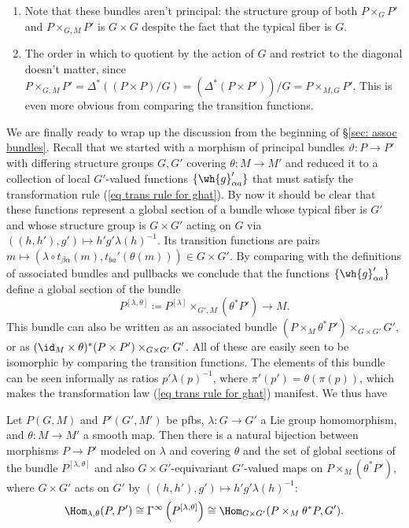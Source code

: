 \begin{rem}
\begin{enumerate}
    \item Note that these bundles aren't principal: the structure group of both $P\times_G P'$ and $P\times_{G,M}P'$ is $G\times G$ despite the fact that the typical fiber is $G$.
    \item The order in which to quotient by the action of $G$ and restrict to the diagonal doesn't matter, since $P\times_{G,M}P'=\Delta^\ast((P\times P)\slash G)=(\Delta^\ast(P\times P'))\slash G=P\times_{M,G}P'$. This is even more obvious from comparing the transition functions.
\end{enumerate}
\end{rem}


We are finally ready to wrap up the discussion from the beginning of \S\ref{sec: assoc bundles}. Recall that we started with a morphism of principal bundles $\vartheta:P\to P'$ with differing structure groups $G,G'$ covering $\theta:M\to M'$ and reduced it to a collection of local $G'$-valued functions $\{\wh{g}_{\alpha a}'\}$ that must satisfy the transformation rule (\ref{eq trans rule for ghat}). By now it should be clear that these functions represent a global section of a bundle whose typical fiber is $G'$ and whose structure group is $G\times G'$ acting on $G$ via $((h,h'),g')\mapsto h'g'\lambda(h)^{-1}$. Its transition functions are pairs $m\mapsto (\lambda\circ t_{\beta\alpha}(m),t_{ba}'(\theta(m)))\in G\times G'$. By comparing with the definitions of associated bundles and pullbacks we conclude that the functions $\{\wh{g}_{\alpha a}'\}$ define a global section of the bundle
\[\boxed{P^{[\lambda,\theta]}\coloneqq P^{[\lambda]}\times_{G',M}(\theta^\ast P')\to M.}\]
This bundle can also be written as an associated bundle $(P\times_M \theta^\ast P')\times_{G\times G'} G'$, or as $(\id_M\times \theta)^\ast(P\times P')\times_{G\times G'}G'$. All of these are easily seen to be isomorphic by comparing the transition functions. The elements of this bundle can be seen informally as ratios $p'\lambda(p)^{-1}$, where $\pi'(p')=\theta(\pi(p))$, which makes the transformation law (\ref{eq trans rule for ghat}) manifest. We thus have
\begin{prop}\label{prop pfb morphisms}
    Let $P(G,M)$ and $P'(G',M')$ be \glspl{pfb}, $\lambda:G\to G'$ a Lie group homomorphism, and $\theta:M\to M'$ a smooth map. Then there is a natural bijection between morphisms $P\to P'$ modeled on $\lambda$ and covering $\theta$ and the set of global sections of the bundle $P^{[\lambda,\theta]}$ and also $G\times G'$-equivariant $G'$-valued maps on $P\times_M (\theta^\ast P')$, where $G\times G'$ acts on $G'$ by $((h,h'),g')\mapsto h'g'\lambda(h)^{-1}$:
    \[\Hom_{\lambda,\theta}(P,P')\cong \Gamma^\infty\left(P^{[\lambda,\theta]}\right)\cong \Hom_{G\times G'}(P\times_M \theta^\ast P,G').\]
\end{prop}

